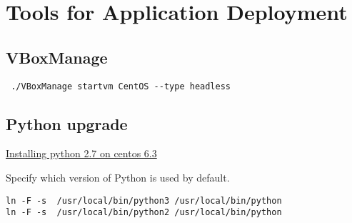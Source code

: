 \section{Tools for Application Deployment}


\subsection{VBoxManage}

\begin{verbatim}
 ./VBoxManage startvm CentOS --type headless
\end{verbatim}

\subsection{Python upgrade}

\href{https://github.com/h2oai/h2o-2/wiki/Installing-python-2.7-on-centos-6.3.-Follow-this-sequence-exactly-for-centos-machine-only}{Installing python 2.7 on centos 6.3}


Specify which version of Python is used by default.
\begin{verbatim}
ln -F -s  /usr/local/bin/python3 /usr/local/bin/python
ln -F -s  /usr/local/bin/python2 /usr/local/bin/python
\end{verbatim}







